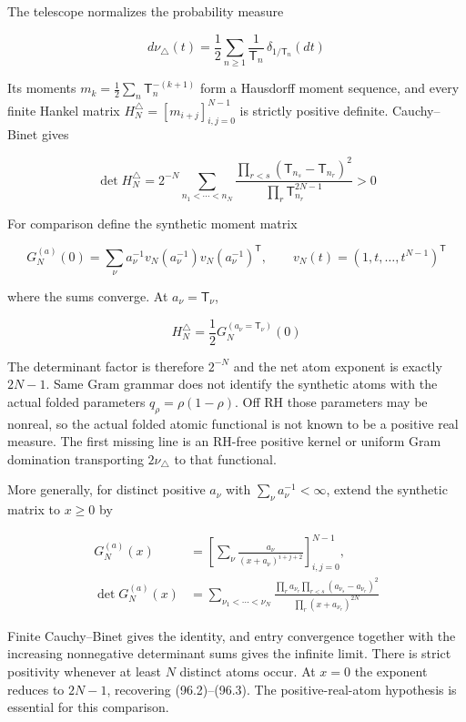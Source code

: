 \documentclass[
  11pt,
]{book}
\begin{document}
The telescope normalizes the probability measure

\[
d\nu_\triangle(t)
=\frac12\sum_{n\ge1}\frac1{\mathsf T_n}\,
\delta_{1/\mathsf T_n}(dt)
\tag{96.1}
\]

Its moments \(m_k=\frac12\sum_n\mathsf T_n^{-(k+1)}\) form a Hausdorff
moment sequence, and every finite Hankel matrix
\(H_N^\triangle=[m_{i+j}]_{i,j=0}^{N-1}\) is strictly positive definite.
Cauchy--Binet gives

\[
\boxed{
\det H_N^\triangle
=2^{-N}\sum_{n_1<\cdots<n_N}
\frac{\prod_{r<s}(\mathsf T_{n_s}-\mathsf T_{n_r})^2}
{\prod_r\mathsf T_{n_r}^{2N-1}}>0
}
\tag{96.2}
\]

For comparison define the synthetic moment matrix

\[
G_N^{(a)}(0)=\sum_\nu a_\nu^{-1}
v_N(a_\nu^{-1})v_N(a_\nu^{-1})^{\mathsf T},
\qquad v_N(t)=(1,t,\ldots,t^{N-1})^{\mathsf T}
\]

where the sums converge. At \(a_\nu=\mathsf T_\nu\),

\[
H_N^\triangle=\frac12G_N^{(a_\nu=\mathsf T_\nu)}(0)
\tag{96.3}
\]

The determinant factor is therefore \(2^{-N}\) and the net atom exponent
is exactly \(2N-1\). Same Gram grammar does not identify the synthetic
atoms with the actual folded parameters \(q_\rho=\rho(1-\rho)\). Off RH
those parameters may be nonreal, so the actual folded atomic functional
is not known to be a positive real measure. The first missing line is an
RH-free positive kernel or uniform Gram domination transporting
\(2\nu_\triangle\) to that functional.

More generally, for distinct positive \(a_\nu\) with
\(\sum_\nu a_\nu^{-1}<\infty\), extend the synthetic matrix to \(x\ge0\)
by

\[
\begin{aligned}
G_N^{(a)}(x)&=\left[\sum_\nu\frac{a_\nu}{(x+a_\nu)^{i+j+2}}
\right]_{i,j=0}^{N-1},\\
\det G_N^{(a)}(x)&=
\sum_{\nu_1<\cdots<\nu_N}
\frac{\prod_r a_{\nu_r}\prod_{r<s}(a_{\nu_s}-a_{\nu_r})^2}
{\prod_r(x+a_{\nu_r})^{2N}}
\end{aligned}
\tag{96.4}
\]

Finite Cauchy--Binet gives the identity, and entry convergence together
with the increasing nonnegative determinant sums gives the infinite
limit. There is strict positivity whenever at least \(N\) distinct atoms
occur. At \(x=0\) the exponent reduces to \(2N-1\), recovering
(96.2)--(96.3). The positive-real-atom hypothesis is essential for this
comparison.
\end{document}
